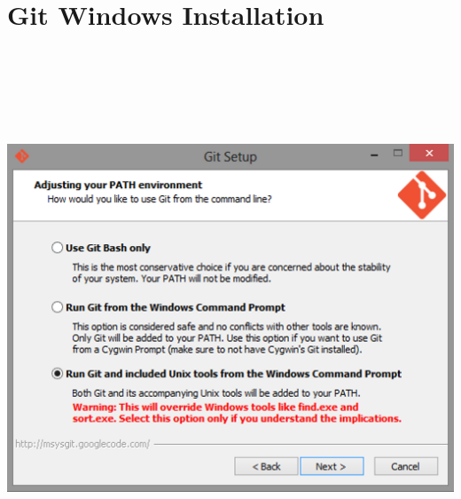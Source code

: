 \documentclass[c]{beamer}
\begin{document}
%
\section{Git Windows Installation}
\begin{frame}
  \begin{center}
     \\ \vspace{10pt}
     \\ \vspace{15pt}
     \\
  \end{center}
\end{frame}

\begin{frame}
 \begin{center}
    \\
  \end{center}
\end{frame}

\begin{frame}
 \begin{center}
    \includegraphics[scale=0.25]{images/git-setup.png} 
 \end{center}
\end{frame}
\end{document}
